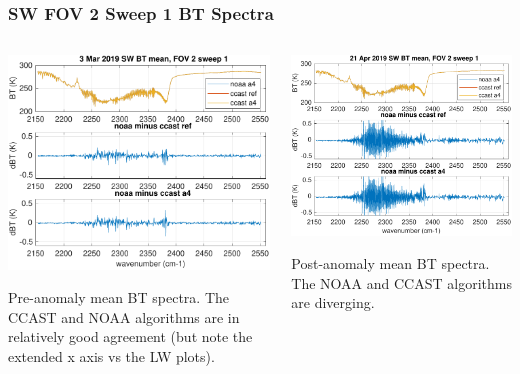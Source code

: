 \documentclass[10pt]{beamer}
\begin{document}
\begin{frame}
\frametitle{SW FOV 2 Sweep 1 BT Spectra}
\begin{columns}[t]
\begin{column}{0.5\textwidth}
  \begin{centering}
  \includegraphics[width=\textwidth]{figures/SW_MW_good_BT_fov2_sd1.pdf}
  \end{centering}\vspace{3mm}
  Pre-anomaly mean BT spectra.  The CCAST and NOAA algorithms are in
  relatively good agreement (but note the extended x axis vs the LW
  plots).

\end{column}
\begin{column}{0.5\textwidth}  
  \begin{centering}
  \includegraphics[width=\textwidth]{figures/SW_MW_fail_BT_fov2_sd1.pdf}
  \end{centering}\vspace{3mm}
  Post-anomaly mean BT spectra.  The NOAA and CCAST algorithms are
  diverging.

\end{column}
\end{columns}
\end{frame}
\end{document}

